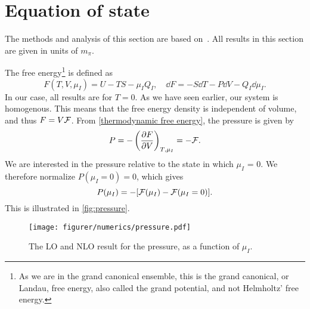\section{Equation of state}
The methods and analysis of this section are based on~\cite{Peskin:IntroQFT,Andersen:two-flavor-chpt,andersen2012introduction}.
All results in this section are given in units of $m_\pi$.

The free energy\footnote{As we are in the grand canonical ensemble, this is the grand canonical, or Landau, free energy, also called the grand potential, and not Helmholtz' free energy.}
is defined as
\begin{equation}
    \label{thermodynamic free energy}
    F(T, V, \mu_I) = U - TS - \mu_I Q_I, 
    \quad \dd 
    F = - S \dd T - P \dd V - Q_I \dd \mu_I.
\end{equation}
%
In our case, all results are for $T = 0$.
As we have seen earlier, our system is homogenous.
This means that the free energy density is independent of volume, and thus $F = V \mathcal{F}$.
From  \cref{thermodynamic free energy}, the pressure is given by
\begin{equation}
    P = - \left(\diffp{F}{V}\right)_{T, \mu_I} = - \Ef.
\end{equation}
%
We are interested in the pressure relative to the state in which $\mu_I$ = 0. We therefore normalize $P(\mu_I=0) = 0$, which gives  
\begin{equation}
    P(\mu_I) = -[\mathcal{F}(\mu_I) - \mathcal{F}(\mu_I = 0)].
\end{equation}
%
This is illustrated in \autoref{fig:pressure}.
\begin{figure}[h]
    \centering
    \vspace{-0.2cm}
    \texttt{[image: figurer/numerics/pressure.pdf]}
    \caption{The LO and NLO result for the pressure, as a function of $\mu_I$.}
    \label{fig:pressure}
\end{figure}

